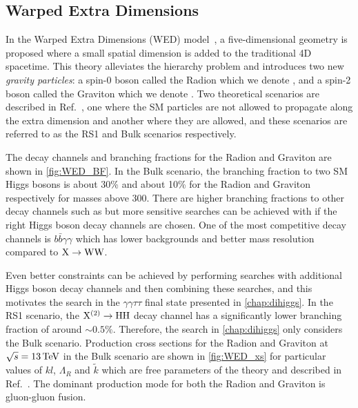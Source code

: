\subsection{Warped Extra Dimensions}\label{sec:wed}
In the Warped Extra Dimensions (WED) model~\cite{Randall:1999ee,Carvalho:2014lsg}, a five-dimensional geometry is proposed where a small spatial dimension is added to the traditional 4D spacetime. This theory alleviates the hierarchy problem and introduces two new \textit{gravity particles}: a spin-0 boson called the Radion which we denote \XZero, and a spin-2 boson called the Graviton which we denote \XTwo. Two theoretical scenarios are described in Ref.~\cite{Carvalho:2014lsg}, one where the SM particles are not allowed to propagate along the extra dimension and another where they are allowed, and these scenarios are referred to as the RS1 and Bulk scenarios respectively.

The decay channels and branching fractions for the Radion and Graviton are shown in \cref{fig:WED_BF}. In the Bulk scenario, the branching fraction to two SM Higgs bosons is about 30\% and about 10\% for the Radion and Graviton respectively for masses above 300\GeV. There are higher branching fractions to other decay channels such as \WW but more sensitive searches can be achieved with \HH if the right Higgs boson decay channels are chosen. One of the most competitive \HH decay channels is $b\bar{b}\gamma\gamma$ which has lower backgrounds and better mass resolution compared to $\mathrm{X} \to \mathrm{W}\mathrm{W}$. 

Even better constraints can be achieved by performing searches with additional Higgs boson decay channels and then combining these searches, and this motivates the \XHH search in the $\gamma\gamma\tau\tau$ final state presented in \cref{chap:dihiggs}. In the RS1 scenario, the $\mathrm{X}^{(2)} \to \mathrm{H}\mathrm{H}$ decay channel has a significantly lower branching fraction of around $\sim0.5\%$. Therefore, the search in \cref{chap:dihiggs} only considers the Bulk scenario. Production cross sections for the Radion and Graviton at $\sqrt{s}=13\,\text{Te\hspace{-.08em}V}$ in the Bulk scenario are shown in \cref{fig:WED_xs} for particular values of $kl$, $\Lambda_R$ and $\tilde{k}$ which are free parameters of the theory and described in Ref.~\cite{Carvalho:2014lsg}. The dominant production mode for both the Radion and Graviton is gluon-gluon fusion.

